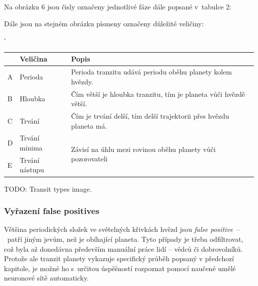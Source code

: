\documentclass[a4paper,12pt]{article}
\begin{document}
{

Na obrázku 6 jsou čisly označeny jednotlivé fáze dále popsané v~tabulce 2:

{

Dále jsou na stejném obrázku písmeny označeny důležité veličiny:

{\catcode` {
\begin{tabular}{|ll|l|}
    \hline
    \rowcolor{lightgray}
     & Veličina & Popis \\
     \hline
     A & Perioda & Perioda tranzitu udává periodu oběhu planety kolem hvězdy. \\
     \hline
     B & Hloubka & Čím větší je hloubka tranzitu, tím je planeta vůči hvězdě větší. \\
     \hline
     C & Trvání & Čím je trvání delší, tím delší trajektorii přes hvězdu planeta má. \\ 
     \hline
     D & Trvání minima & \multirow{2}{*}{Závisí na úhlu mezi rovinou oběhu planety vůči pozorovateli} \\
     \cline{1-2}
     E & Trvání nástupu & \\
     \hline
\end{tabular}
}}

TODO: Transit types image.

\newpage

\subsubsection{Vyřazení false positives}

Většina periodických složek ve světelných křivkách hvězd jsou \emph{false positive}~--~patří jiným jevům, než je obíhající planeta. Tyto případy je třeba odfiltrovat, což byla až donedávna především manuální práce lidí -- vědců či dobrovolníků. Protože ale tranzit planety vykazuje specifický průběh popsaný v předchozí kapitole, je možné ho s~určitou úspěšností rozpoznat pomocí naučené umělé neuronové sítě automaticky.~\cite{kepler80}

}}
\end{document}
